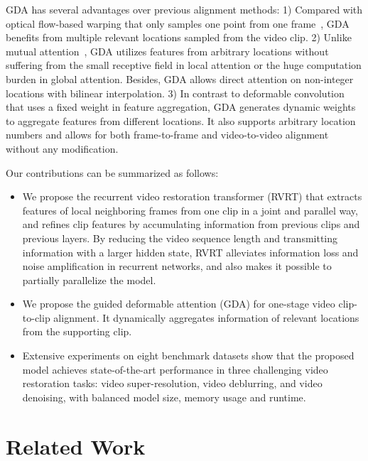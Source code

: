 \documentclass{article}
\newlength \g
\begin{document}
GDA has several advantages over previous alignment methods: 1) Compared with optical flow-based warping that only samples one point from one frame~\cite{sajjadi2018FRVSR, xue2019TOFlow-Vimeo-90K, chan2021basicvsr}, GDA benefits from multiple relevant locations sampled from the video clip. 2) Unlike mutual attention~\cite{liang2022vrt}, GDA utilizes features from arbitrary locations without suffering from the small receptive field in local attention or the huge computation burden in global attention. Besides, GDA allows direct attention on non-integer locations with bilinear interpolation. 3) In contrast to deformable convolution~\cite{dai2017deformable, zhu2019deformable, tian2020tdan, wang2019edvr, chan2021basicvsr++, chan2021understanding} that uses a fixed weight in feature aggregation, GDA generates dynamic weights to aggregate features from different locations. It also supports arbitrary location numbers and allows for both frame-to-frame and video-to-video alignment without any modification.

Our contributions can be summarized as follows:
\begin{itemize}
\item We propose the recurrent video restoration transformer (RVRT) that extracts features of local neighboring frames from one clip in a joint and parallel way, and refines clip features by accumulating information from previous clips and previous layers. By reducing the video sequence length and transmitting information with a larger hidden state, RVRT alleviates information loss and noise amplification in recurrent networks, and also makes it possible to partially parallelize the model.
\item We propose the guided deformable attention (GDA) for one-stage video clip-to-clip alignment. It dynamically aggregates information of relevant locations from the supporting clip.
\item Extensive experiments on eight benchmark datasets show that the proposed model achieves state-of-the-art performance in three challenging video restoration tasks: video super-resolution, video deblurring, and video denoising, with balanced model size, memory usage and runtime.
\end{itemize}



\section{Related Work}
\end{document}
